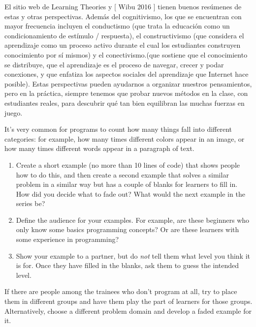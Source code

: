 El sitio web de Learning Theories y [ Wibu 2016 ] tienen buenos resúmenes de estas y otras perspectivas. Además del cognitivismo, los que se encuentran con mayor frecuencia incluyen el conductismo (que trata la educación como un condicionamiento de estímulo / respuesta), el constructivismo (que considera el aprendizaje como un proceso activo durante el cual los estudiantes construyen conocimiento por sí mismos) y el conectivismo.(que sostiene que el conocimiento se distribuye, que el aprendizaje es el proceso de navegar, crecer y podar conexiones, y que enfatiza los aspectos sociales del aprendizaje que Internet hace posible). Estas perspectivas pueden ayudarnos a organizar nuestros pensamientos, pero en la práctica, siempre tenemos que probar nuevos métodos en la clase, con estudiantes reales, para descubrir qué tan bien equilibran las muchas fuerzas en juego.



It's very common for programs to count how many things fall into different categories:
for example,
how many times different colors appear in an image,
or how many times different words appear in a paragraph of text.

\begin{enumerate}
\item
  Create a short example (no more than 10 lines of code) that shows people how to do this,
  and then create a second example that solves a similar problem in a similar way
  but has a couple of blanks for learners to fill in.
  How did you decide what to fade out?
  What would the next example in the series be?

\item
  Define the audience for your examples.
  For example,
  are these beginners who only know some basics programming concepts?
  Or are these learners with some experience in programming?

\item
  Show your example to a partner,
  but do \emph{not} tell them what level you think it is for.
  Once they have filled in the blanks,
  ask them to guess the intended level.

\end{enumerate}

If there are people among the trainees who don't program at all,
try to place them in different groups
and have them play the part of learners for those groups.
Alternatively,
choose a different problem domain and develop a faded example for it.

